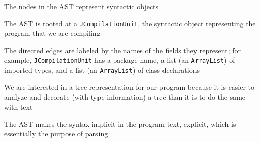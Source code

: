 \documentclass[8pt,a4paper,compress]{beamer}
\begin{document}
\begin{frame}[fragile]
\pause

AST for the \lstinline{Factorial} program
\begin{center}
}
\end{center}
\end{frame}

\begin{frame}[fragile]
\pause

The nodes in the AST represent syntactic objects

\pause
\bigskip

The AST is rooted at a \lstinline{JCompilationUnit}, the syntactic object representing the program that we are compiling

\pause
\bigskip

The directed edges are labeled by the names of the fields they represent; for example, \lstinline{JCompilationUnit} has a package name, a list (an \lstinline{ArrayList}) of imported types, and a list (an \lstinline{ArrayList}) of class declarations

\pause
\bigskip

We are interested in a tree representation for our program because it is easier to analyze and decorate (with type information) a tree than it is to do the same with text

\pause
\bigskip

The AST makes the syntax implicit in the program text, explicit, which is essentially the purpose of parsing
\end{frame}
\end{document}
